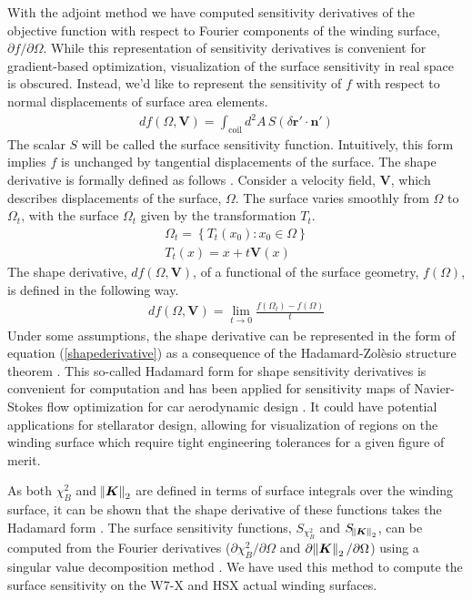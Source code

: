 \documentclass[aps,unsortedaddress]{revtex4-1}
\begin{document}
With the adjoint method we have computed sensitivity derivatives of the objective function with respect to Fourier components of the winding surface, $\partial f/\partial \Omega$. While this representation of sensitivity derivatives is convenient for gradient-based optimization, visualization of the surface sensitivity in real space is obscured. Instead, we'd like to represent the sensitivity of $f$ with respect to normal displacements of surface area elements. 
\begin{gather}
d f(\Omega,\bm{V}) = \int_{\text{coil}} d^2 A \, S \left( \delta \bm{r}' \cdot \bm{n}' \right)
\label{shapederivative}
\end{gather}
The scalar $S$ will be called the surface sensitivity function. Intuitively, this form implies $f$ is unchanged by tangential displacements of the surface. The shape derivative is formally defined as follows \cite{Delfour2011}. Consider a velocity field, $\bm{V}$, which describes displacements of the surface, $\Omega$. The surface varies smoothly from $\Omega$ to $\Omega_t$, with the surface $\Omega_t$ given by the transformation $T_t$.
\begin{gather}
\Omega_t = \left \{ T_t(x_0) : x_0 \in \Omega \right \} \\
T_t(x) = x + t \bm{V}(x)
\end{gather}
The shape derivative, $df(\Omega,\bm{V})$, of a functional of the surface geometry, $f(\Omega)$, is defined in the following way. 
\begin{gather}
d f(\Omega, \bm{V}) = \lim_{t \rightarrow 0} \frac{ f(\Omega_t) - f(\Omega)}{t}
\end{gather}
Under some assumptions, the shape derivative can be represented in the form of equation (\ref{shapederivative}) as a consequence of the Hadamard-Zol\`{e}sio structure theorem \cite{Delfour2011}. This so-called Hadamard form for shape sensitivity derivatives is convenient for computation and has been applied for sensitivity maps of Navier-Stokes flow optimization for car aerodynamic design \cite{Othmer2008,Othmer2014}. It could have potential applications for stellarator design, allowing for visualization of regions on the winding surface which require tight engineering tolerances for a given figure of merit. 

As both $\chi^2_B$ and $\norm{\bm{K}}_2$ are defined in terms of surface integrals over the winding surface, it can be shown that the shape derivative of these functions takes the Hadamard form \cite{Novotny2013}. The surface sensitivity functions, $S_{\chi^2_B}$ and $S_{\norm{\bm{K}}_2}$, can be computed from the Fourier derivatives ($\partial \chi^2_B/\partial \Omega$ and $\partial \norm{\bm{K}}_2/\partial \Omega$) using a singular value decomposition method \cite{Landreman2018}. We have used this method to compute the surface sensitivity on the W7-X and HSX actual winding surfaces.  
\end{document}
